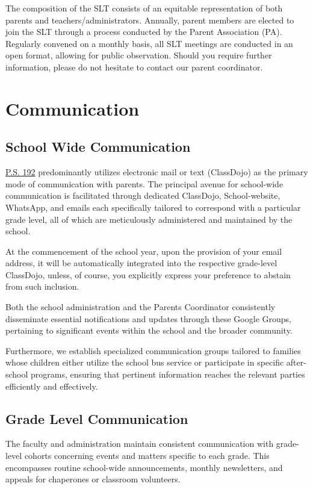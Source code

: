 \documentclass[11pt, letterpaper]{article}
\begin{document}
The composition of the SLT consists of an equitable representation of both parents and teachers/administrators. Annually, parent members are elected to join the SLT through a process conducted by the Parent Association (PA). Regularly convened on a monthly basis, all SLT meetings are conducted in an open format, allowing for public observation. Should you require further information, please do not hesitate to contact our parent coordinator.

\section{Communication}
\subsection{School Wide Communication} 
\href{https://www.ps192.org}{P.S. 192} predominantly utilizes electronic mail or text (ClassDojo) as the primary mode of communication with parents. The principal avenue for school-wide communication is facilitated through dedicated ClassDojo, School-website, WhatsApp, and emails each specifically tailored to correspond with a particular grade level, all of which are meticulously administered and maintained by the school.

At the commencement of the school year, upon the provision of your email address, it will be automatically integrated into the respective grade-level ClassDojo, unless, of course, you explicitly express your preference to abstain from such inclusion.

Both the school administration and the Parents Coordinator consistently disseminate essential notifications and updates through these Google Groups, pertaining to significant events within the school and the broader community.

Furthermore, we establish specialized communication groups tailored to families whose children either utilize the school bus service or participate in specific after-school programs, ensuring that pertinent information reaches the relevant parties efficiently and effectively.

\subsection{Grade Level Communication} 
The faculty and administration maintain consistent communication with grade-level cohorts concerning events and matters specific to each grade. This encompasses routine school-wide announcements, monthly newsletters, and appeals for chaperones or classroom volunteers.
\end{document}

